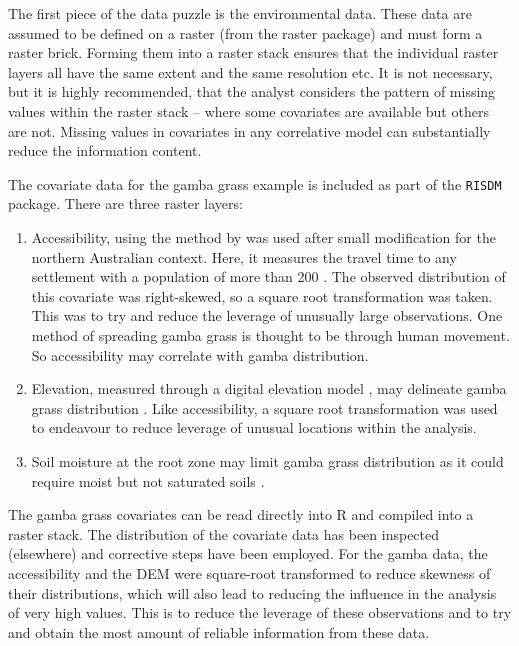 \documentclass[article,shortnames,nojss]{jss}\usepackage[]{graphicx}\usepackage[]{xcolor}
\begin{document}
The first piece of the data puzzle is the environmental data. These data are assumed to be defined on a raster (from the raster package) and must form a raster brick. Forming them into a raster stack ensures that the individual raster layers all have the same extent and the same resolution etc. It is not necessary, but it is highly recommended, that the analyst considers the pattern of missing values within the raster stack -- where some covariates are available but others are not. Missing values in covariates in any correlative model can substantially reduce the information content.

The covariate data for the gamba grass example is included as part of the \texttt{RISDM} package. There are three raster layers: 
\begin{enumerate}
  \item Accessibility, using the method by \citep{wei18} was used after small modification for the northern Australian context. Here, it measures the travel time to any settlement with a population of more than 200 \citep{geo06}. The observed distribution of this covariate was right-skewed, so a square root transformation was taken. This was to try and reduce the leverage of unusually large observations. One method of spreading gamba grass is thought to be through human movement. So accessibility may correlate with gamba distribution.
  \item Elevation, measured through a digital elevation model \citep[DEM; from][]{gal15}, may delineate gamba grass distribution \citep{ada15}. Like accessibility, a square root transformation was used to endeavour to reduce leverage of unusual locations within the analysis.
  \item Soil moisture at the root zone \citep[SMRZ][]{fro18} may limit gamba grass distribution as it could require moist but not saturated soils \citep{flo05,pet12}.
\end{enumerate}
The gamba grass covariates can be read directly into R and compiled into a raster stack. The distribution of the covariate data has been inspected (elsewhere) and corrective steps have been employed. For the gamba data, the accessibility and the DEM were square-root transformed to reduce skewness of their distributions, which will also lead to reducing the influence in the analysis of very high values. This is to reduce the leverage of these observations and to try and obtain the most amount of reliable information from these data. 
\end{document}
